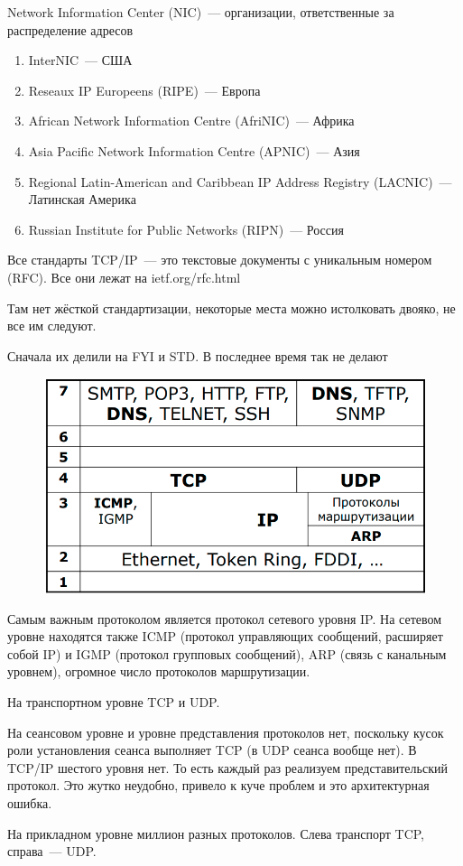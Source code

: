 
Network Information Center (NIC)~--- организации, ответственные за распределение адресов
\begin{enumerate}
    \item InterNIC~--- США
    \item Reseaux IP Europeens (RIPE)~--- Европа
    \item African Network Information Centre (AfriNIC)~--- Африка
    \item Asia Pacific Network Information Centre (APNIC)~--- Азия
    \item Regional Latin-American and Caribbean IP Address Registry (LACNIC)~--- Латинская Америка
    \item Russian Institute for Public Networks (RIPN)~--- Россия
\end{enumerate}


Все стандарты TCP/IP~--- это текстовые документы с уникальным номером (RFC). Все они лежат на ietf.org/rfc.html

Там нет жёсткой стандартизации, некоторые места можно истолковать двояко, не все им следуют.

Сначала их делили на FYI и STD. В последнее время так не делают


\begin{figure}[H]
  \centering
  \includegraphics[width=15cm]{images/00/03}
\end{figure}

Самым важным протоколом является протокол сетевого уровня IP. На сетевом уровне находятся также ICMP (протокол управляющих сообщений, расширяет собой IP) и IGMP (протокол групповых сообщений), ARP (связь с канальным уровнем), огромное число протоколов маршрутизации.

На транспортном уровне TCP и UDP. 

На сеансовом уровне и уровне представления протоколов нет, поскольку кусок роли установления сеанса выполняет TCP (в UDP сеанса вообще нет). В TCP/IP шестого уровня нет. То есть каждый раз реализуем представительский протокол. Это жутко неудобно, привело к куче проблем и это архитектурная ошибка.

На прикладном уровне миллион разных протоколов. Слева транспорт TCP, справа~--- UDP. 

